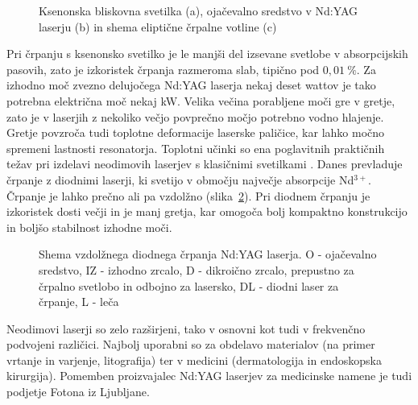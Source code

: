 \begin{figure}[h]
\centering
\def\svgwidth{120truemm} 

\caption{Ksenonska bliskovna svetilka (a), ojačevalno sredstvo v Nd:YAG laserju (b) 
in shema eliptične črpalne votline (c)}
\label{fig:Nd}
\end{figure}

Pri črpanju s ksenonsko svetilko je le manjši del izsevane svetlobe v
absorpcijskih pasovih, zato je izkoristek črpanja razmeroma slab, tipično 
pod $0,01~\%$. Za izhodno moč zvezno delujočega Nd:YAG laserja nekaj deset wattov je tako
potrebna električna moč nekaj kW. Velika večina porabljene moči 
gre v gretje, zato je v laserjih z nekoliko večjo povprečno
močjo potrebno vodno hlajenje. Gretje povzroča tudi toplotne deformacije
laserske paličice, kar lahko močno spremeni lastnosti resonatorja. Toplotni
učinki so ena poglavitnih praktičnih težav pri izdelavi neodimovih
laserjev s klasičnimi svetilkami . Danes prevladuje
 črpanje z diodnimi laserji, ki svetijo v območju največje
absorpcije Nd$^{3+}$. Črpanje je lahko prečno ali pa vzdolžno (slika~\ref{fig:NdS}). 
Pri diodnem črpanju je izkoristek dosti večji in je manj gretja, kar omogoča 
bolj kompaktno konstrukcijo in boljšo stabilnost izhodne moči.
\begin{figure}[h]
\centering
\def\svgwidth{120truemm} 

\caption{Shema vzdolžnega diodnega črpanja Nd:YAG laserja. O - ojačevalno sredstvo, 
IZ - izhodno zrcalo, D - dikroično zrcalo, 
prepustno za črpalno svetlobo in odbojno za lasersko, DL - diodni 
laser za črpanje, L - leča
}
\label{fig:NdS}
\end{figure}

Neodimovi laserji so zelo razširjeni, tako v osnovni kot tudi v frekvenčno 
podvojeni različici. 
Najbolj uporabni so za obdelavo materialov (na primer vrtanje in varjenje, 
litografija) ter v medicini (dermatologija in endoskopska kirurgija). 
Pomemben proizvajalec Nd:YAG laserjev 
za medicinske namene je tudi podjetje Fotona iz Ljubljane. 

